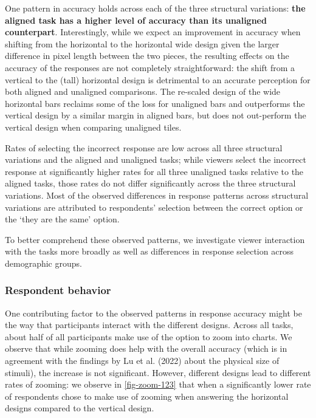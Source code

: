 \documentclass[
]{jds}
\begin{document}
One pattern in accuracy holds across each of the three structural
variations: \textbf{the aligned task has a higher level of accuracy than
its unaligned counterpart}. Interestingly, while we expect an
improvement in accuracy when shifting from the horizontal to the
horizontal wide design given the larger difference in pixel length
between the two pieces, the resulting effects on the accuracy of the
responses are not completely straightforward: the shift from a vertical
to the (tall) horizontal design is detrimental to an accurate perception
for both aligned and unaligned comparisons. The re-scaled design of the
wide horizontal bars reclaims some of the loss for unaligned bars and
outperforms the vertical design by a similar margin in aligned bars, but
does not out-perform the vertical design when comparing unaligned tiles.

Rates of selecting the incorrect response are low across all three
structural variations and the aligned and unaligned tasks; while viewers
select the incorrect response at significantly higher rates for all
three unaligned tasks relative to the aligned tasks, those rates do not
differ significantly across the three structural variations. Most of the
observed differences in response patterns across structural variations
are attributed to respondents' selection between the correct option or
the `they are the same' option.

To better comprehend these observed patterns, we investigate viewer
interaction with the tasks more broadly as well as differences in
response selection across demographic groups.

\hypertarget{respondent-behavior}{%
\subsubsection{Respondent behavior}\label{respondent-behavior}}

One contributing factor to the observed patterns in response accuracy
might be the way that participants interact with the different designs.
Across all tasks, about half of all participants make use of the option
to zoom into charts. We observe that while zooming does help with the
overall accuracy (which is in agreement with the findings by Lu et al.
(2022) about the physical size of stimuli), the increase is not
significant. However, different designs lead to different rates of
zooming: we observe in \autoref{fig-zoom-123} that when a significantly
lower rate of respondents chose to make use of zooming when answering
the horizontal designs compared to the vertical design.
\end{document}
